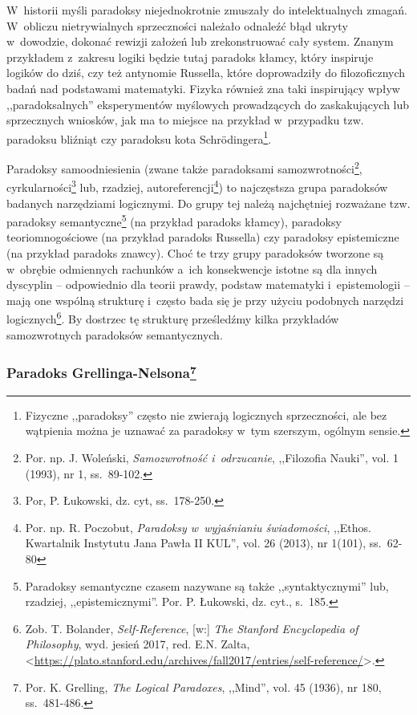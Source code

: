 W~historii myśli paradoksy niejednokrotnie zmuszały do intelektualnych zmagań. W~obliczu nietrywialnych sprzeczności należało odnaleźć błąd ukryty w~dowodzie, dokonać rewizji założeń lub zrekonstruować cały system. Znanym przykładem z~zakresu logiki będzie tutaj paradoks kłamcy, który inspiruje logików do dziś, czy też antynomie Russella, które doprowadziły do filozoficznych badań nad podstawami matematyki. Fizyka również zna taki inspirujący wpływ ,,paradoksalnych'' eksperymentów myślowych prowadzących do zaskakujących lub sprzecznych wniosków, jak ma to miejsce na przykład w~przypadku tzw. paradoksu bliźniąt czy paradoksu kota Schrödingera\footnote{Fizyczne ,,paradoksy'' często nie zwierają logicznych sprzeczności, ale bez wątpienia można je uznawać za paradoksy w~tym szerszym, ogólnym sensie.}.

Paradoksy samoodniesienia (zwane także paradoksami samozwrotności\footnote{Por. np. J. Woleński, \textit{Samozwrotność i~odrzucanie}, ,,Filozofia Nauki'', vol. 1 (1993), nr 1, ss.~89-102.}, cyrkularności\footnote{Por, P. Łukowski, dz. cyt, ss.~178-250.} lub, rzadziej, autoreferencji\footnote{Por. np. R. Poczobut, \textit{Paradoksy w~wyjaśnianiu świadomości}, ,,Ethos. Kwartalnik Instytutu Jana Pawła II KUL'', vol. 26 (2013), nr 1(101), ss.~62-80}) to najczęstsza grupa paradoksów badanych narzędziami logicznymi. Do grupy tej należą najchętniej rozważane tzw. paradoksy semantyczne\footnote{Paradoksy semantyczne czasem nazywane są także ,,syntaktycznymi'' lub, rzadziej, ,,epistemicznymi''. Por. P. Łukowski, dz. cyt., s.~185.} (na przykład paradoks kłamcy), paradoksy teoriomnogościowe (na przykład paradoks Russella) czy paradoksy epistemiczne (na przykład paradoks znawcy). Choć te trzy grupy paradoksów tworzone są w~obrębie odmiennych rachunków a~ich konsekwencje istotne są dla innych dyscyplin -- odpowiednio dla teorii prawdy, podstaw matematyki i~epistemologii -- mają one wspólną strukturę i~często bada się je przy użyciu podobnych narzędzi logicznych\footnote{Zob. T. Bolander, \textit{Self-Reference}, [w:] \textit{The Stanford Encyclopedia of Philosophy}, wyd. jesień 2017, red. E.N. Zalta, {\textless}\url{https://plato.stanford.edu/archives/fall2017/entries/self-reference/}{\textgreater}.}. By dostrzec tę strukturę prześledźmy kilka przykładów samozwrotnych paradoksów semantycznych.

\subsubsection[Paradoks Grellinga-Nelsona]{Paradoks Grellinga-Nelsona\footnote{Por. K. Grelling, \textit{The Logical Paradoxes}, ,,Mind'', vol. 45 (1936), nr 180, ss.~481-486.}}


